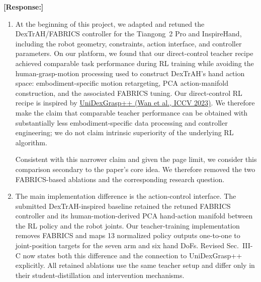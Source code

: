 \documentclass[11pt]{article}
\newcommand{\response}{\par\smallskip\noindent\textcolor{responseblue}{\textbf{[Response:]}}\ }
\begin{document}
\response
\begin{enumerate}[label=(\arabic*),leftmargin=2em,itemsep=6pt,topsep=3pt]
  \item At the beginning of this project, we adapted and retuned the
  DexTrAH/FABRICS controller for the Tiangong~2 Pro and InspireHand, including
  the robot geometry, constraints, action interface, and controller parameters.
  On our platform, we found that our direct-control teacher recipe achieved
  comparable task performance during RL training while avoiding the
  human-grasp-motion processing used to construct DexTrAH's hand action space:
  embodiment-specific motion retargeting, PCA action-manifold construction, and
  the associated FABRICS tuning. Our direct-control RL recipe is
  inspired by \href{https://openaccess.thecvf.com/content/ICCV2023/html/Wan_UniDexGrasp_Improving_Dexterous_Grasping_Policy_Learning_via_Geometry-Aware_Curriculum_and_ICCV_2023_paper.html}{UniDexGrasp++ (Wan et al., ICCV 2023)}.
  We therefore make the claim that comparable
  teacher performance can be obtained with substantially less
  embodiment-specific data processing and controller engineering; we do not
  claim intrinsic superiority of the underlying RL algorithm.\par
  \pagebreak\noindent Consistent with
  this narrower claim and given the page limit, we consider this comparison
  secondary to the paper's core idea. We therefore removed the two
  FABRICS-based ablations and the corresponding research question.

  \item The main implementation difference is the action-control interface.
  The submitted DexTrAH-inspired baseline retained the retuned FABRICS
  controller and its human-motion-derived PCA hand-action manifold between the
  RL policy and the robot joints. Our teacher-training implementation removes
  FABRICS and maps 13 normalized policy outputs one-to-one to joint-position
  targets for the seven arm and six hand DoFs. Revised Sec.~III-C now states
  both this difference and the connection to UniDexGrasp++ explicitly. All
  retained ablations use the same teacher setup and differ only in their
  student-distillation and intervention mechanisms.


\end{enumerate}
\end{document}
